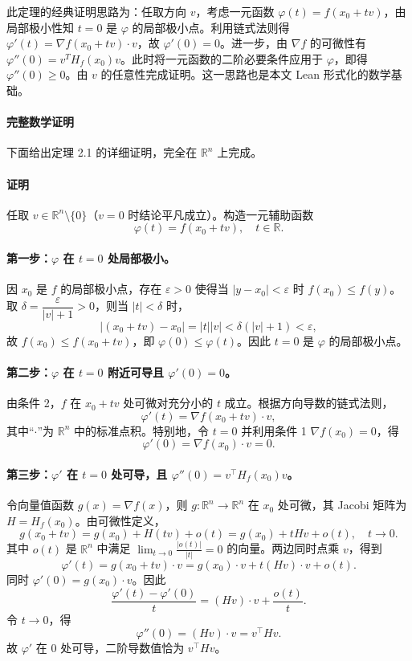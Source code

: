 ﻿\documentclass[UTF8,a4paper,zihao=-4]{ctexart}
\begin{document}
此定理的经典证明思路为：任取方向 \(v\)，考虑一元函数 \(\varphi(t)=f(x_0+tv)\)，由局部极小性知 \(t=0\) 是 \(\varphi\) 的局部极小点。利用链式法则得 \(\varphi'(t)=\nabla f(x_0+tv)\cdot v\)，故 \(\varphi'(0)=0\)。进一步，由 \(\nabla f\) 的可微性有 \(\varphi''(0)=v^T H_f(x_0)v\)。此时将一元函数的二阶必要条件应用于 \(\varphi\)，即得 \(\varphi''(0)\ge0\)。由 \(v\) 的任意性完成证明。这一思路也是本文 Lean 形式化的数学基础。

\paragraph{完整数学证明}下面给出定理 2.1 的详细证明，完全在 \(\mathbb{R}^n\) 上完成。

\paragraph{证明}任取 \(v\in\mathbb{R}^n\setminus\{0\}\)（\(v=0\) 时结论平凡成立）。构造一元辅助函数
\[
\varphi(t)=f(x_0+tv),\quad t\in\mathbb{R}.
\]
\paragraph{第一步：\(\varphi\) 在 \(t=0\) 处局部极小。}因 \(x_0\) 是 \(f\) 的局部极小点，存在 \(\varepsilon>0\) 使得当 \(|y-x_0|<\varepsilon\) 时 \(f(x_0)\le f(y)\)。取 \(\delta=\dfrac{\varepsilon}{|v|+1}>0\)，则当 \(|t|<\delta\) 时，
\[
|(x_0+tv)-x_0|=|t||v|<\delta(|v|+1)<\varepsilon,
\]
故 \(f(x_0)\le f(x_0+tv)\)，即 \(\varphi(0)\le\varphi(t)\)。因此 \(t=0\) 是 \(\varphi\) 的局部极小点。

\paragraph{第二步：\(\varphi\) 在 \(t=0\) 附近可导且 \(\varphi'(0)=0\)。}由条件 2，\(f\) 在 \(x_0+tv\) 处可微对充分小的 \(t\) 成立。根据方向导数的链式法则，
\[
\varphi'(t)=\nabla f(x_0+tv)\cdot v,
\]
其中“\(\cdot\)”为 \(\mathbb{R}^n\) 中的标准点积。特别地，令 \(t=0\) 并利用条件 1 \(\nabla f(x_0)=0\)，得
\[
\varphi'(0)=\nabla f(x_0)\cdot v=0.
\]
\paragraph{第三步：\(\varphi'\) 在 \(t=0\) 处可导，且 \(\varphi''(0)=v^{\top} H_f(x_0) v\)。}令向量值函数 \(g(x)=\nabla f(x)\)，则 \(g:\mathbb{R}^n\to\mathbb{R}^n\) 在 \(x_0\) 处可微，其 Jacobi 矩阵为 \(H=H_f(x_0)\)。由可微性定义，
\[
g(x_0+tv)=g(x_0)+H(tv)+o(t)=g(x_0)+tHv+o(t),\quad t\to0.
\]
其中 \(o(t)\) 是 \(\mathbb{R}^n\) 中满足 \(\lim_{t\to0}\frac{|o(t)|}{|t|}=0\) 的向量。两边同时点乘 \(v\)，得到
\[
\varphi'(t)=g(x_0+tv)\cdot v=g(x_0)\cdot v+t(Hv)\cdot v+o(t).
\]
同时 \(\varphi'(0)=g(x_0)\cdot v\)。因此
\[
\frac{\varphi'(t)-\varphi'(0)}{t}=(Hv)\cdot v+\frac{o(t)}{t}.
\]
令 \(t\to0\)，得
\[
\varphi''(0)=(Hv)\cdot v=v^{\top}Hv.
\]
故 \(\varphi'\) 在 \(0\) 处可导，二阶导数值恰为 \(v^{\top}Hv\)。
\end{document}
